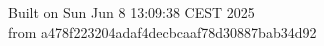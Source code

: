 {\noindent Built on Sun Jun  8 13:09:38 CEST 2025} \\ 
 {\noindent from a478f223204adaf4decbcaaf78d30887bab34d92}

